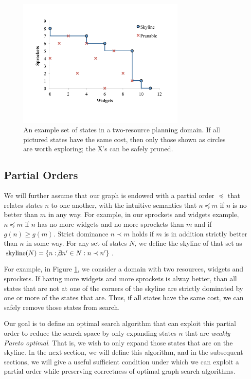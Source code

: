 \documentclass[letterpaper]{article}
\theoremstyle{plain} \newtheorem{theorem}{Theorem} \newtheorem{proposition}{Proposition} \newtheorem{lemma}{Lemma}
\theoremstyle{definition} \newtheorem{definition}{Definition} \newtheorem{conjecture}{Conjecture} \newtheorem*{example}{Example}
\theoremstyle{remark} \newtheorem*{remark}{Remark} \newtheorem*{note}{Note} \newtheorem{case}{Case}
\begin{document}
\begin{figure}
	\begin{center}
	\includegraphics[width=3.3in]{skyline2d.pdf}
\end{center}
  \caption{An example set of states in a two-resource planning domain. If
all pictured states have the same cost, then only those shown as circles are
worth exploring; the X's can be safely pruned.}
  \label{fig:skyline}
\end{figure}


\subsection{Partial Orders}

We will further assume that our graph is endowed with a partial
order $\preceq$ that relates states $n$ to one another, with the
intuitive semantics that $n \preceq m$ if $n$ is no better than $m$
in any way. For example, in our sprockets and widgets example, $n
\preceq m$ if $n$ has no more widgets and no more sprockets than
$m$ and if $g(n) \ge g(m)$. Strict dominance $n \prec m$ holds if
$m$ is in addition strictly better than $n$ in some way.  For any
set of states $N$, we define the skyline of that set as
$\textrm{skyline}(N)=\{n: \not\exists n^\prime \in N: n \prec
n^\prime\}$. 

For example, in Figure \ref{fig:skyline}, we consider a domain with
two resources, widgets and sprockets. If having more widgets and
more sprockets is alway better, than all states that are not at one
of the corners of the skyline are strictly dominated by one or more
of the states that are.  Thus, if all states have the same cost,
we can safely remove those states from search.

Our goal is to define an optimal search algorithm that can exploit
this partial order to reduce the search space by only expanding
states $n$ that are \textit{weakly Pareto optimal}. That is, we
wish to only expand those states that are on the skyline. In the
next section, we will define this algorithm, and in the subsequent
sections, we will give a useful sufficient condition under which
we can exploit a partial order while preserving correctness of
optimal graph search algorithms.
\end{document}
